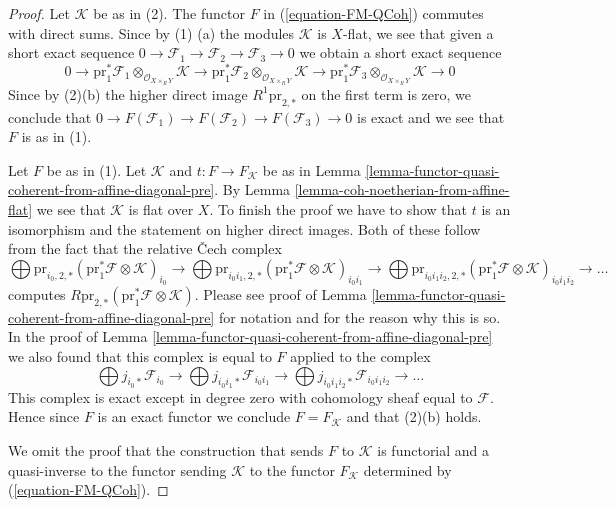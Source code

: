 \begin{proof}
Let $\mathcal{K}$ be as in (2). The functor $F$ in
(\ref{equation-FM-QCoh}) commutes with direct sums.
Since by (1) (a) the modules $\mathcal{K}$ is $X$-flat,
we see that given a short exact
sequence $0 \to \mathcal{F}_1 \to \mathcal{F}_2 \to \mathcal{F}_3 \to 0$
we obtain a short exact sequence
$$
0 \to
\text{pr}_1^*\mathcal{F}_1 \otimes_{\mathcal{O}_{X \times_R Y}} \mathcal{K} \to
\text{pr}_1^*\mathcal{F}_2 \otimes_{\mathcal{O}_{X \times_R Y}} \mathcal{K} \to
\text{pr}_1^*\mathcal{F}_3 \otimes_{\mathcal{O}_{X \times_R Y}} \mathcal{K} \to
0
$$
Since by (2)(b) the higher direct image $R^1\text{pr}_{2, *}$
on the first term is zero, we conclude that
$0 \to F(\mathcal{F}_1) \to F(\mathcal{F}_2) \to F(\mathcal{F}_3) \to 0$
is exact and we see that $F$ is as in (1).

\medskip\noindent
Let $F$ be as in (1). Let $\mathcal{K}$ and $t : F \to F_\mathcal{K}$ be as
in Lemma \ref{lemma-functor-quasi-coherent-from-affine-diagonal-pre}.
By Lemma \ref{lemma-coh-noetherian-from-affine-flat} we see
that $\mathcal{K}$ is flat over $X$. To finish the proof we have
to show that $t$ is an isomorphism and the statement on higher
direct images. Both of these follow from the fact that the
relative {\v C}ech complex
$$
\bigoplus 
\text{pr}_{i_0, 2, *}
(\text{pr}_1^*\mathcal{F} \otimes \mathcal{K})_{i_0}
\to
\bigoplus 
\text{pr}_{i_0i_1, 2, *}
(\text{pr}_1^*\mathcal{F} \otimes \mathcal{K})_{i_0i_1}
\to
\bigoplus 
\text{pr}_{i_0i_1i_2, 2, *}
(\text{pr}_1^*\mathcal{F} \otimes \mathcal{K})_{i_0i_1i_2}
\to \ldots
$$
computes $R\text{pr}_{2, *}(\text{pr}_1^*\mathcal{F} \otimes \mathcal{K})$.
Please see proof of
Lemma \ref{lemma-functor-quasi-coherent-from-affine-diagonal-pre}
for notation and for the reason why this is so. In the proof of
Lemma \ref{lemma-functor-quasi-coherent-from-affine-diagonal-pre}
we also found that this complex is equal to $F$ applied to the complex
$$
\bigoplus j_{i_0*}\mathcal{F}_{i_0} \to
\bigoplus j_{i_0i_1*}\mathcal{F}_{i_0i_1} \to
\bigoplus j_{i_0i_1i_2*}\mathcal{F}_{i_0i_1i_2} \to \ldots
$$
This complex is exact except in degree zero with cohomology
sheaf equal to $\mathcal{F}$. Hence since $F$ is an exact functor
we conclude $F = F_\mathcal{K}$ and that (2)(b) holds.

\medskip\noindent
We omit the proof that the construction that sends $F$ to
$\mathcal{K}$ is functorial and a quasi-inverse to the
functor sending $\mathcal{K}$ to the functor $F_\mathcal{K}$
determined by (\ref{equation-FM-QCoh}).
\end{proof}


